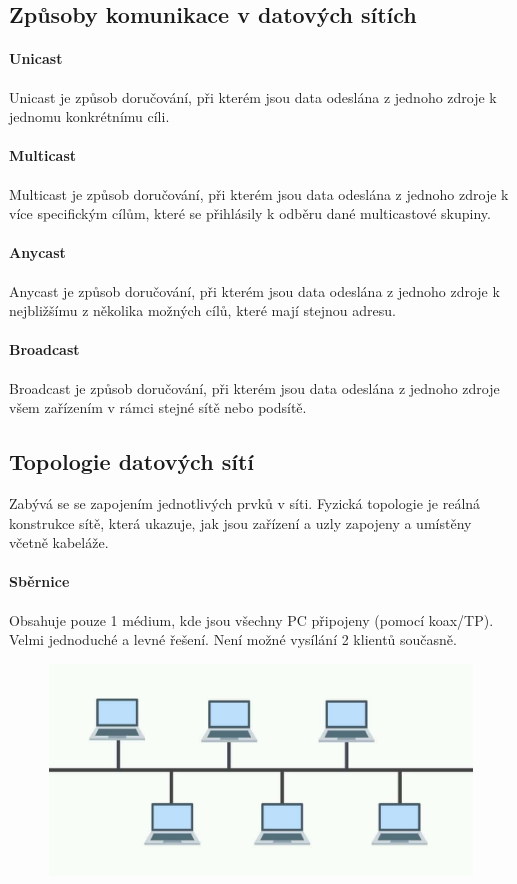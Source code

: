 \subsection{Způsoby komunikace v datových sítích}
\paragraph{Unicast}
Unicast je způsob doručování, při kterém jsou data odeslána z jednoho zdroje k jednomu konkrétnímu cíli.
\paragraph{Multicast}
Multicast je způsob doručování, při kterém jsou data odeslána z jednoho zdroje k více specifickým cílům, které se přihlásily k odběru dané multicastové skupiny.
\paragraph{Anycast}
Anycast je způsob doručování, při kterém jsou data odeslána z jednoho zdroje k nejbližšímu z několika možných cílů, které mají stejnou adresu.
\paragraph{Broadcast}
Broadcast je způsob doručování, při kterém jsou data odeslána z jednoho zdroje všem zařízením v rámci stejné sítě nebo podsítě.

\subsection{Topologie datových sítí}
Zabývá se se zapojením jednotlivých prvků v síti. Fyzická topologie je reálná konstrukce sítě, která ukazuje, jak jsou zařízení a uzly zapojeny a umístěny včetně kabeláže.

\paragraph{Sběrnice}
Obsahuje pouze 1 médium, kde jsou všechny PC připojeny (pomocí koax/TP). Velmi jednoduché a levné řešení. 
Není možné vysílání 2 klientů současně.
\begin{figure}[h]
\centering
\includegraphics[scale=0.1]{sections/10_kom_roz_dat_sit/images/bus.jpg}
\end{figure}

